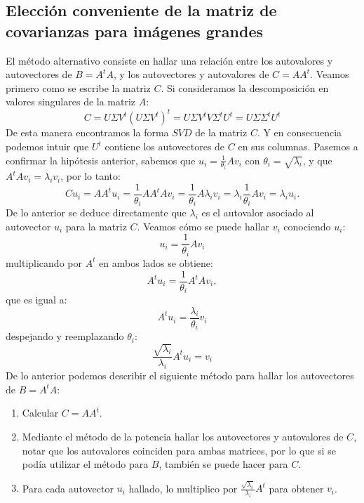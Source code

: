 \subsection{Elección conveniente de la matriz de covarianzas para imágenes grandes}
\label{metodoAlternativo}
El método alternativo consiste en hallar una relación entre los autovalores y autovectores de $B = A^tA$, y los autovectores y autovalores de $C = A A^t$.
Veamos primero como se escribe la matriz $C$. Si consideramos la descomposición en valores singulares de la matriz $A$:
\begin{displaymath}
  C = U \Sigma V^t (U \Sigma V^t)^{t} = U \Sigma V^t V \Sigma^{t} U^{t}  = U \Sigma \Sigma^{t} U^{t}
\end{displaymath}
De esta manera encontramos la forma $SVD$ de la matriz $C$. Y en consecuencia podemos intuir que $U^t$ contiene los autovectores de $C$ en sus columnas.
Pasemos a confirmar la hipótesis anterior, sabemos que $u_{i} = \frac{1}{\theta_{i}}Av_{i}$ con $\theta_{i} = \sqrt{ \lambda_{i} }$, y que $A^{t} A v_{i} = \lambda_{i} v_{i}$, por lo tanto:
\begin{displaymath}
C u_{i} = A A^{t} u_{i} = \frac{1}{ \theta_{i} } A A^{t}  A v_{i} =  \frac{ 1 }{  \theta_{i} } A  \lambda_{i} v_{i} =  \lambda_{i} \frac{ 1 }{ \theta_{i} } A  v_{i} = \lambda_{i} u_{i}.
\end{displaymath}
De lo anterior se deduce directamente que $\lambda_{i}$ es el autovalor asociado al autovector $u_{i}$ para la matriz $C$.
Veamos cómo se puede hallar $v_{i}$ conociendo $u_{i}$:
\begin{displaymath}
  u_{i} = \frac{1}{ \theta_{i} } A v_{i}
\end{displaymath}
multiplicando por $A^{t}$ en ambos lados se obtiene:
\begin{displaymath}
  A^{t} u_{i} =  \frac{1}{ \theta_{i} } A^{t} A v_{i},  
\end{displaymath}
que es igual a: 
\begin{displaymath}
  A^{t} u_{i} = \frac{\lambda_{i}}{ \theta_{i} }  v_{i} 
\end{displaymath}
despejando y reemplazando $\theta_{i}$:
\begin{displaymath}
  \frac{ \sqrt{\lambda_{i} } }{ \lambda_{i} }  A^{t} u_{i} = v_{i}
\end{displaymath}
De lo anterior podemos describir el siguiente método para hallar los autovectores de $B = A^{t}A$:
\begin{enumerate}
\setlength{\itemindent}{0.2in}
\item Calcular $C = AA^{t}$.
\item Mediante el método de la potencia hallar los autovectores y autovalores de $C$, notar que los autovalores coinciden para ambas matrices, por lo que si  se podía utilizar el método para $B$, también se puede hacer para $C$.
\item Para cada autovector $u_{i}$ hallado, lo multiplico por $\frac{ \sqrt{\lambda_{i} } }{ \lambda_{i} }  A^{t}$ para obtener $v_{i}$.
\end{enumerate}


